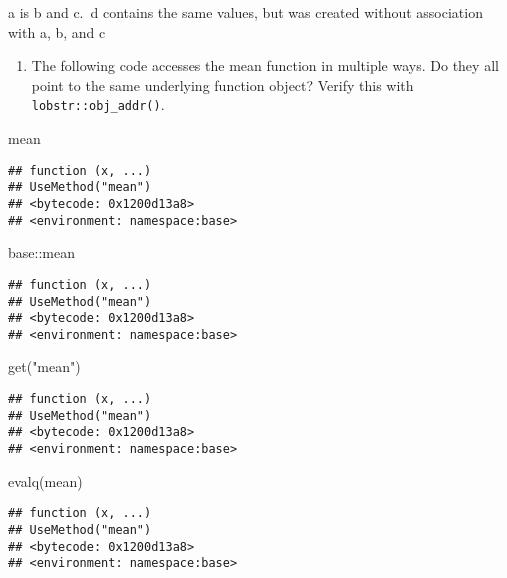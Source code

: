 \documentclass[
]{article}
\newenvironment{Shaded}{\begin{snugshade}}{\end{snugshade}}
\newcommand{\FunctionTok}[1]{\textcolor[rgb]{0.00,0.00,0.00}{#1}}
\newcommand{\NormalTok}[1]{#1}
\newcommand{\SpecialCharTok}[1]{\textcolor[rgb]{0.00,0.00,0.00}{#1}}
\newcommand{\StringTok}[1]{\textcolor[rgb]{0.31,0.60,0.02}{#1}}
\providecommand{\tightlist}{%
  \setlength{\itemsep}{0pt}\setlength{\parskip}{0pt}}
\begin{document}
a is b and c.~d contains the same values, but was created without
association with a, b, and c

\begin{enumerate}
\def\labelenumi{\arabic{enumi}.}
\setcounter{enumi}{1}
\tightlist
\item
  The following code accesses the mean function in multiple ways. Do
  they all point to the same underlying function object? Verify this
  with \texttt{lobstr::obj\_addr()}.
\end{enumerate}

\begin{Shaded}
\begin{Highlighting}[]
\NormalTok{mean}
\end{Highlighting}
\end{Shaded}

\begin{verbatim}
## function (x, ...) 
## UseMethod("mean")
## <bytecode: 0x1200d13a8>
## <environment: namespace:base>
\end{verbatim}

\begin{Shaded}
\begin{Highlighting}[]
\NormalTok{base}\SpecialCharTok{::}\NormalTok{mean}
\end{Highlighting}
\end{Shaded}

\begin{verbatim}
## function (x, ...) 
## UseMethod("mean")
## <bytecode: 0x1200d13a8>
## <environment: namespace:base>
\end{verbatim}

\begin{Shaded}
\begin{Highlighting}[]
\FunctionTok{get}\NormalTok{(}\StringTok{"mean"}\NormalTok{)}
\end{Highlighting}
\end{Shaded}

\begin{verbatim}
## function (x, ...) 
## UseMethod("mean")
## <bytecode: 0x1200d13a8>
## <environment: namespace:base>
\end{verbatim}

\begin{Shaded}
\begin{Highlighting}[]
\FunctionTok{evalq}\NormalTok{(mean)}
\end{Highlighting}
\end{Shaded}

\begin{verbatim}
## function (x, ...) 
## UseMethod("mean")
## <bytecode: 0x1200d13a8>
## <environment: namespace:base>
\end{verbatim}
\end{document}
